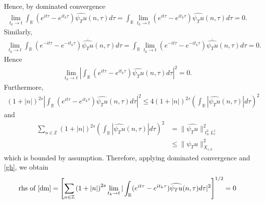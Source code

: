 \documentclass[12pt,reqno]{amsart}
\numberwithin{equation}{section}  %
\numberwithin{figure}{section}
\newcommand{\rr}{\mathbb{R}}
\newcommand{\zz}{\mathbb{Z}}
\newcommand{\wh}{\widehat}
\theoremstyle{plain}
\theoremstyle{definition}
\theoremstyle{remark}
\begin{document}
%
%
Hence, by dominated convergence
%
%
\begin{equation*}
\begin{split}
\lim_{t_{k} \to t}  \int_{\rr} (e^{it \tau} - e^{it_{k} \tau})
    \wh{\psi_{T} u}(n,
    \tau) d \tau =  \int_{\rr} \lim_{t_{k} \to t} (e^{it \tau} - e^{it_{k} \tau})
    \wh{\psi_{T} u}(n,
    \tau) d \tau = 0. 
\end{split}
\end{equation*}
%
%
Similarly, 
%
%
%
\begin{equation*}
\begin{split}
\lim_{t_{k} \to t} \int_{\rr} (e^{-it \tau} - e^{-it_{k} \tau})
    \overline{\wh{\psi_{T} u}}(n,
    \tau) d \tau  =\int_{\rr}  \lim_{t_{k} \to t} (e^{-it \tau} - e^{-it_{k} \tau})
    \overline{\wh{\psi_{T} u}}(n,
    \tau) d \tau  = 0.
\end{split}
\end{equation*}
%
%
Hence
%
%
%
\begin{equation}
  \label{gh}
\begin{split}
  \lim_{t_{k} \to t} | \int_{\rr} (e^{it \tau} - e^{it_{k} \tau})
    \wh{\psi_{T} u}(n,
		\tau) d \tau |^2 = 0.
\end{split}
\end{equation}
%
%
		Furthermore,
    \begin{equation*}
    \begin{split}
      (1 + | n |)^{2s} | \int_{\rr} \left( e^{it\tau} - e^{it_{k} \tau} \right)
      \wh{\psi_{T}u}(n, \tau) d \tau|^{2} \le 4 (1 + | n |)^{2s} \left(
      \int_{\rr} | \wh{\psi_{T} u}(n, \tau)  | d \tau
      \right)^{2}
    \end{split}
    \end{equation*}
    and
		\begin{equation*}
			\begin{split}
         \sum_{n \in \zz}  \left( 1 + | n |
        \right)^{2s} \left ( \int_{\rr} |\wh{\psi_{T} u}(n, \tau)| d \tau
        \right )^2  
        & = \|\wh{\psi_{T} u}\|_{\ell^{2}_{n}L^{1}_{\tau}}^2
		\\
		& \le \|\psi_{T} u \|_{X_{s,b}}^2 
	\end{split}
\end{equation*}
which is bounded by assumption. Therefore, applying dominated convergence and
\eqref{gh}, we
obtain 
%
%
\begin{equation*}
\begin{split}
  \text{rhs of \eqref{dm}} = \left[ \sum_{n \in \zz} \left( 1 + | n |
    \right)^{2s} \lim_{t_{k} \to t} | \int_{\rr} (e^{it \tau} - e^{it_{k} \tau})
    \wh{\psi_{T} u}(n,
		\tau) d \tau |^2 \right]^{1/2} = 0
\end{split}
\end{equation*}
\end{document}
